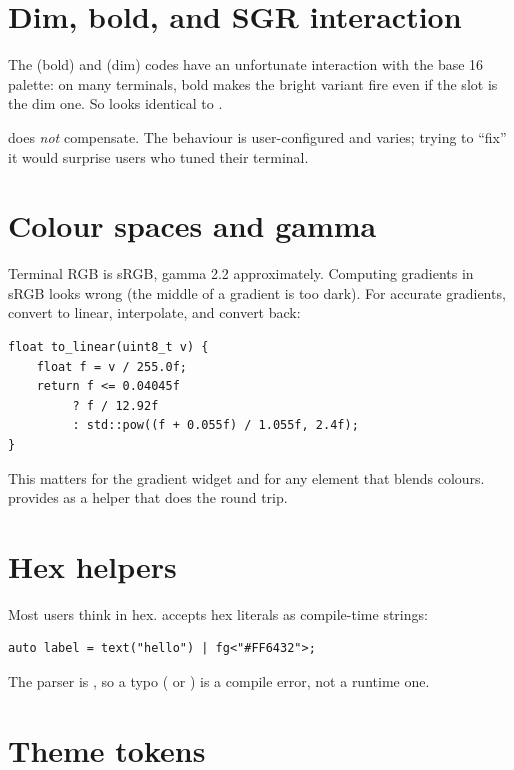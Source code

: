 \section{Dim, bold, and SGR interaction}

The \code{ESC [ 1 m} (bold) and \code{ESC [ 2 m} (dim) codes
have an unfortunate interaction with the base 16 palette: on
many terminals, bold makes the bright variant fire even if the
slot is the dim one. So  looks identical to
.

\maya{} does \emph{not} compensate. The behaviour is
user-configured and varies; trying to ``fix'' it would surprise
users who tuned their terminal.

\section{Colour spaces and gamma}

Terminal RGB is sRGB, gamma 2.2 approximately. Computing
gradients in sRGB looks wrong (the middle of a gradient is too
dark). For accurate gradients, convert to linear, interpolate,
and convert back:

\begin{lstlisting}
float to_linear(uint8_t v) {
    float f = v / 255.0f;
    return f <= 0.04045f
         ? f / 12.92f
         : std::pow((f + 0.055f) / 1.055f, 2.4f);
}
\end{lstlisting}

This matters for the gradient widget and for any element that
blends colours. \maya{} provides  as a helper
that does the round trip.

\section{Hex helpers}

Most users think in hex. \maya{} accepts hex literals as
compile-time strings:

\begin{lstlisting}
auto label = text("hello") | fg<"#FF6432">;
\end{lstlisting}

The parser is , so a typo ( or
) is a compile error, not a runtime one.

\section{Theme tokens}

